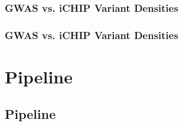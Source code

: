 \documentclass{beamer}
\begin{document}
\begin{frame}[t]
    \frametitle{GWAS vs. iCHIP Variant Densities}
    \centering
\end{frame}
\begin{frame}[t]
    \frametitle{GWAS vs. iCHIP Variant Densities}
    \centering
\end{frame}


\section{Pipeline}
\subsection{Pipeline}
\end{document}
